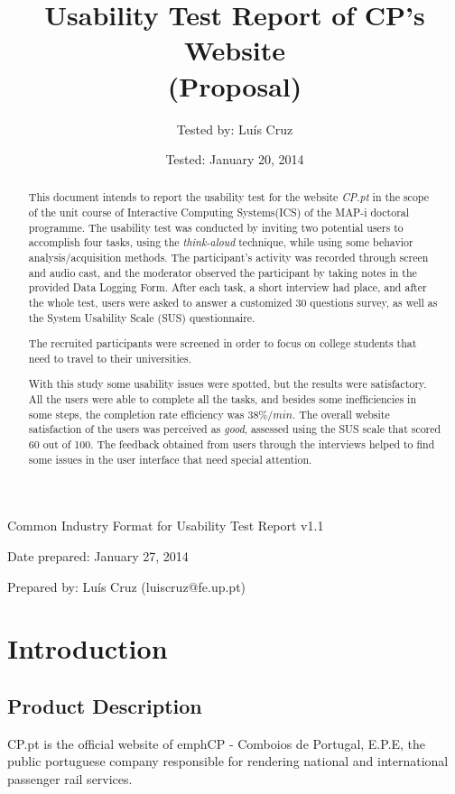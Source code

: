\documentclass[a4paper]{article}
\title{Usability Test Report of CP's Website\\ (Proposal)}
\author[1]{Tested by: Luís  Cruz}
\affil[1]{MAP-i\\ Joint Doctoral Programme in Computer Science}
\date{Tested: January 20, 2014}
\begin{document}
\maketitle

Common Industry Format for Usability Test Report v1.1

Date prepared: January 27, 2014

Prepared by: Luís Cruz (luiscruz@fe.up.pt)

\begin{abstract}
	
	This document intends to report the usability test for the website \emph{CP.pt} in the scope of the unit course of Interactive Computing Systems(ICS) of the MAP-i doctoral programme. The usability test was conducted by inviting two potential users to accomplish four tasks, using the \emph{think-aloud} technique, while using some behavior analysis/acquisition methods. The participant's activity was recorded through screen and audio cast, and the moderator observed the participant by taking notes in the provided Data Logging Form. After each task, a short interview had place, and after the whole test, users were asked to answer a customized 30 questions survey, as well as the System Usability Scale (SUS) questionnaire.

The recruited participants were screened in order to focus on college students that need to travel to their universities. 

With this study some usability issues were spotted, but the results were satisfactory. All the users were able to complete all the tasks, and besides some inefficiencies in some steps, the completion rate efficiency was $38\%/min$.
The overall website satisfaction of the users was perceived as \emph{good}, assessed using the SUS scale that scored 60 out of 100. The feedback obtained from users through the interviews helped to find some issues in the user interface that need special attention.
\end{abstract}

\section{Introduction}
\subsection{Product Description}

CP.pt is the official website of emph{CP - Comboios de Portugal, E.P.E}, the public portuguese company responsible for rendering national and international passenger rail services.
\end{document}
